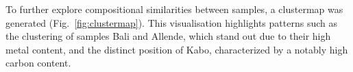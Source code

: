 To further explore compositional similarities between samples, a clustermap was generated (Fig.~\ref{fig:clustermap}). This visualisation highlights patterns such as the clustering of samples Bali and Allende, which stand out due to their high metal content, and the distinct position of Kabo, characterized by a notably high carbon content.




